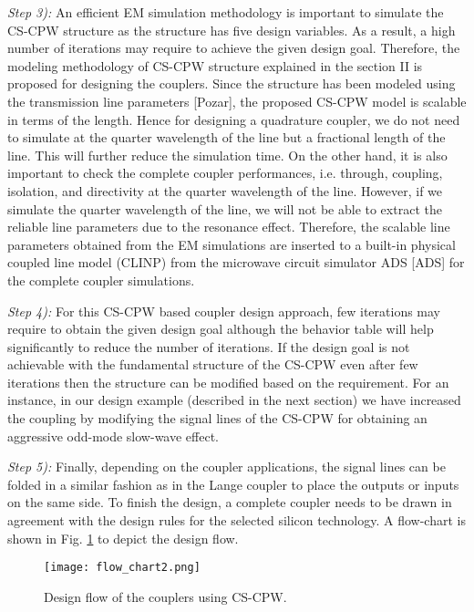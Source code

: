 \documentclass[journal]{IEEEtran}
\begin{document}
\textit{Step 3):} An efficient EM simulation methodology is important to simulate the CS-CPW structure as the structure has five design variables. As a result, a high number of iterations may require to achieve the given design goal. Therefore, the modeling methodology of CS-CPW structure explained in the section II is proposed for designing the couplers. Since the structure has been modeled using the transmission line parameters [Pozar], the proposed CS-CPW model is scalable in terms of the length. Hence for designing a quadrature coupler, we do not need to simulate at the quarter wavelength of the line but a fractional length of the line. This will further reduce the simulation time. On the other hand, it is also important to check the complete coupler performances, i.e. through, coupling, isolation, and directivity at the quarter wavelength of the line. However, if we simulate the quarter wavelength of the line, we will not be able to extract the reliable line parameters due to the resonance effect. Therefore, the scalable line parameters obtained from the EM simulations are inserted to a built-in physical coupled line model (CLINP) from the microwave circuit simulator ADS [ADS] for the complete coupler simulations. 

\textit{Step 4):} For this CS-CPW based coupler design approach, few iterations may require to obtain the given design goal although the behavior table will help significantly to reduce the number of iterations. If the design goal is not achievable with the fundamental structure of the CS-CPW even after few iterations then the structure can be modified based on the requirement. For an instance, in our design example (described in the next section) we have increased the coupling by modifying the signal lines of the CS-CPW for obtaining an aggressive odd-mode slow-wave effect.

\textit{Step 5):} Finally, depending on the coupler applications, the signal lines can be folded in a similar fashion as in the Lange coupler to place the outputs or inputs on the same side. To finish the design, a complete coupler needs to be drawn in agreement with the design rules for the selected silicon technology. A flow-chart is shown in Fig. \ref{flow_chart} to depict the design flow.

\begin{figure}
	\texttt{[image: flow\_chart2.png]}
	\caption{Design flow of the couplers using CS-CPW.}
	\label{flow_chart}
\end{figure}
\end{document}
